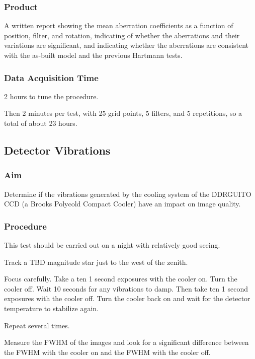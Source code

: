 \documentclass{article}
\begin{document}
\subsubsection{Product}

A written report showing the mean aberration coefficients as a function of position, filter, and rotation, indicating of whether the aberrations and their variations are significant, and indicating whether the aberrations are consistent with the as-built model and the previous Hartmann tests.

\subsubsection{Data Acquisition Time}

2 hours to tune the procedure.

Then 2 minutes per test, with 25 grid points, 5 filters, and 5 repetitions, so a total of about 23 hours.


\subsection{Detector Vibrations}

\subsubsection{Aim}

Determine if the vibrations generated by the cooling system of the DDRGUITO CCD (a Brooks Polycold Compact Cooler) have an impact on image quality. 

\subsubsection{Procedure}

This test should be carried out on a night with relatively good seeing.

Track a TBD magnitude star just to the west of the zenith.

Focus carefully. Take a ten 1 second exposures with the cooler on. Turn the cooler off. Wait 10 seconds for any vibrations to damp. Then take ten 1 second exposures with the cooler off. Turn the cooler back on and wait for the detector temperature to stabilize again.

Repeat several times.

Measure the FWHM of the images and look for a significant difference between the FWHM with the cooler on and the FWHM with the cooler off.
\end{document}
